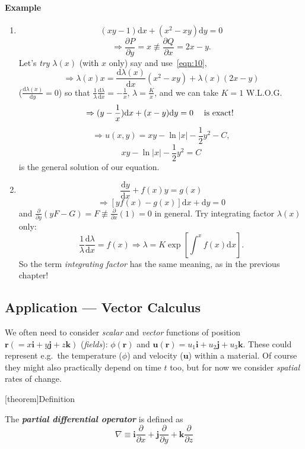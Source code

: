 \documentclass[12pt]{report}
\theoremstyle{definition}
\begin{document}
\paragraph{Example}
\begin{enumerate}[label = (\arabic*)]
    \item 
\[
    (xy-1)\mathrm{d}x + (x^{2}-xy)\mathrm{d}y = 0
\]\[
    \Rightarrow{}\frac{\partial P}{\partial y} = x 
    \not\equiv \frac{\partial Q}{\partial x} = 2x-y.
\]
Let's \emph{try} $\lambda(x)$ (with $x$ only) say and use~\eqref{eqn:10},\[
    \Rightarrow{} \lambda(x)x = \frac{\mathrm{d}\lambda(x)}{\mathrm{d}x} (x^{2}-xy) + \lambda(x)(2x-y)
\]($\frac{\mathrm{d}\lambda(x)}{\mathrm{d}y} = 0$) so that 
$\frac{1}{\lambda} \frac{\mathrm{d}\lambda}{\mathrm{d}x} = -\frac{1}{x}$, 
$\lambda = \frac{K}{x}$,
and we can take $K = 1$ W.L.O.G.\[
\Rightarrow{}(y-\frac{1}{x})\mathrm{d}x + (x-y)\mathrm{d}y = 0 \quad\;\textnormal{is exact!}\;
\]\[
\Rightarrow{}u(x,y) = xy - \ln{|x|} - \frac{1}{2}y^{2} - C,
\]\[
xy - \ln{|x|} - \frac{1}{2}y^{2} = C
\]is the general solution of our equation.

\item \[
        \frac{\mathrm{d}y}{\mathrm{d}x} + f(x)y = g(x)
\]\[
\Rightarrow{}[yf(x) - g(x)]\mathrm{d}x + \mathrm{d}y = 0
\]and $\frac{\partial}{\partial y} (yF-G) = F \not\equiv \frac{\partial}{\partial x} (1) = 0$ in general.
Try integrating factor $\lambda(x)$ only:\[
    \frac{1}{\lambda} \frac{\mathrm{d} \lambda}{\mathrm{d}x} = f(x)
    \Rightarrow{}\lambda = K \exp{\left[\int_{}^{x} f(x)\mathrm{d}x\right]}.
\]
So the term \emph{integrating factor} has the same meaning, as in the previous chapter!
\end{enumerate}

\subsection{Application --- Vector Calculus}

We often need to consider \emph{scalar} and \emph{vector} functions of position
$\mathbf{r} (= x\mathbf{i} + y\mathbf{j} + z\mathbf{k})$ (\emph{fields}): 
$\phi(\mathbf{r})$ and $\mathbf{u}(\mathbf{r}) = u_1\mathbf{i} + u_2\mathbf{j} + u_3\mathbf{k}$.
These could represent e.g.\ the temperature ($\phi$) and velocity ($\mathbf{u}$) within a material.
Of course they might also practically depend on time $t$ too, but for now
we consider \emph{spatial} rates of change.

[theorem]{Definition}
\begin{partial differential operator}
The \textbf{\emph{partial differential operator}} is defined as\[
    \nabla \equiv \mathbf{i}\frac{\partial}{\partial x} + \mathbf{j}\frac{\partial}{\partial y} + \mathbf{k}\frac{\partial}{\partial z}
\]
\end{partial differential operator}
\end{document}
